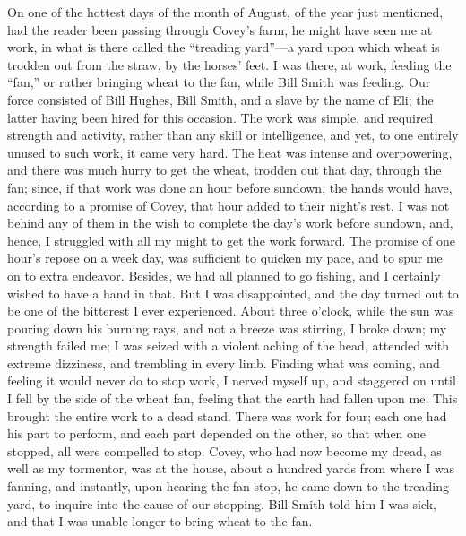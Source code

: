 On one of the hottest days of the month of August, of the year just
mentioned, had the reader been passing through Covey's farm, he might
have seen me at work, in what is there called the ``treading yard''---a
yard upon which wheat is trodden out from the straw, by the horses'
feet. I was there, at work, feeding the ``fan,'' or rather bringing
wheat to the fan, while Bill Smith was feeding. Our force consisted of
Bill Hughes, Bill Smith, and a slave by the name of Eli; the latter
having been hired for this occasion. The work was simple, and required
strength and activity, rather than any skill or intelligence, and yet,
to one entirely unused to such work, it came very hard. The heat was
intense and overpowering, and there was much hurry to get the wheat,
trodden out that day, through the fan; since, if that work was done an
hour before sundown, the hands would have, according to a promise of
Covey, that hour added to their night's rest. I was not behind any of
them in the wish to complete the day's work before sundown, and, hence,
I struggled with all my might to get the work forward. The
{\protect\hypertarget{224}{}{}}promise of one hour's repose on a week
day, was sufficient to quicken my pace, and to spur me on to extra
endeavor. Besides, we had all planned to go fishing, and I certainly
wished to have a hand in that. But I was disappointed, and the day
turned out to be one of the bitterest I ever experienced. About three
o'clock, while the sun was pouring down his burning rays, and not a
breeze was stirring, I broke down; my strength failed me; I was seized
with a violent aching of the head, attended with extreme dizziness, and
trembling in every limb. Finding what was coming, and feeling it would
never do to stop work, I nerved myself up, and staggered on until I fell
by the side of the wheat fan, feeling that the earth had fallen upon me.
This brought the entire work to a dead stand. There was work for four;
each one had his part to perform, and each part depended on the other,
so that when one stopped, all were compelled to stop. Covey, who had now
become my dread, as well as my tormentor, was at the house, about a
hundred yards from where I was fanning, and instantly, upon hearing the
fan stop, he came down to the treading yard, to inquire into the cause
of our stopping. Bill Smith told him I was sick, and that I was unable
longer to bring wheat to the fan.

